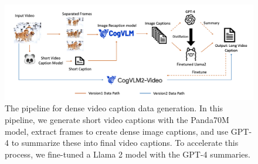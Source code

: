 \begin{figure}[h]
\begin{center}
\includegraphics[width=\linewidth]{images/pipeline.jpg}
\end{center}
\caption{The pipeline for dense video caption data generation. In this pipeline, we generate short video captions with the Panda70M model, extract frames to create dense image captions, and use GPT-4 to summarize these into final video captions. To accelerate this process, we fine-tuned a Llama 2 model with the GPT-4 summaries.}
\label{fig:video_caption_gen}
\end{figure}